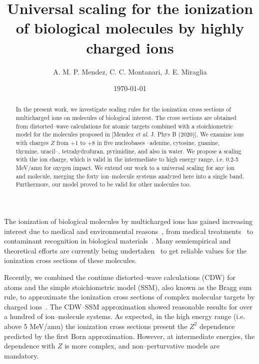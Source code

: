 \documentclass[10pt,showpacs,showkeys,twocolumn]{revtex4}
\begin{document}
\title[Universal scaling for the ionization of biological molecules]{
Universal scaling for the ionization of biological molecules by highly charged ions}
\author{A. M. P. Mendez, C. C. Montanari, J. E. Miraglia}

\date{\today}%

\begin{abstract}
In the present work, we investigate scaling rules for the ionization cross sections of multicharged ions on molecules of biological interest. The cross sections are obtained from distorted--wave calculations for atomic targets combined with a stoichiometric model for the molecules proposed in [Mendez \textit{et al.} J. Phys B (2020)]. We examine ions with charges $Z$ from $+1$ to $+8$ in five nucleobases --adenine, cytosine, guanine, thymine, uracil--, tetrahydrofuran, pyrimidine, and also in water. We propose a scaling with the ion charge, which is valid in the intermediate to high energy range, i.e. 0.2-5 MeV/amu for oxygen impact. We extend our work to a universal scaling for any ion and molecule, merging the forty ion--molecule systems analyzed here into a single band. Furthermore, our model proved to be valid for other molecules too.  
\end{abstract}


\maketitle


The ionization of biological molecules by multicharged ions has gained increasing interest due to medical and environmental reasons~\cite{PhysMed}, from medical treatments~\cite{Mohamad2017,Solov2009,Denifl2011} to contaminant recognition in biological materials~\cite{water,ferrazdias}. Many semiempirical \citep{vera_prl2013} and theoretical efforts are currently being undertaken~\cite{MendezJPB20,Quinto20,ludde2019,ludde2018,ludde2016,Champion2012} to get reliable values for the ionization cross sections of these molecules. 

Recently, we combined the continue distorted--wave calculations (CDW) for atoms and the simple stoichiometric model (SSM), also known as the Bragg sum rule, to approximate the ionization cross sections of complex molecular targets by charged ions~\cite{MendezJPB20}. The CDW--SSM approximation showed reasonable results for over a hundred of ion--molecule systems. As expected, in the high energy range (i.e. above 5 MeV/amu) the ionization cross sections  present the $Z^2$ dependence predicted by the first Born approximation. However, at intermediate energies, the dependence with $Z$ is more complex, and non--perturvative models are mandatory.  
\end{document}
